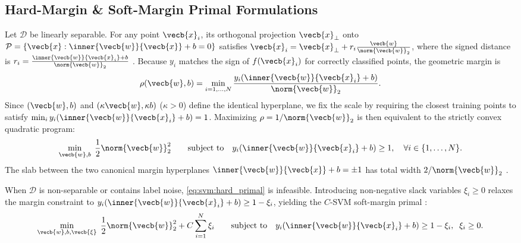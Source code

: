 \documentclass[../../../../master.tex]{subfiles}
\begin{document}
\subsection{Hard-Margin \& Soft-Margin Primal Formulations}

\begin{coremath}
Let $\mathcal{D}$ be linearly separable. For any point $\vecb{x}_i$, its orthogonal projection $\vecb{x}_{\perp}$ onto $\mathcal{P} = \{\vecb{x} : \inner{\vecb{w}}{\vecb{x}} + b = 0\}$ satisfies $\vecb{x}_i = \vecb{x}_{\perp} + r_i \frac{\vecb{w}}{\norm{\vecb{w}}_2}$, where the signed distance is $r_i = \frac{\inner{\vecb{w}}{\vecb{x}_i} + b}{\norm{\vecb{w}}_2}$  . Because $y_i$ matches the sign of $f(\vecb{x}_i)$ for correctly classified points, the geometric margin is
\begin{equation}
  \rho(\vecb{w}, b) = \min_{i=1,\dots,N} \frac{y_i (\inner{\vecb{w}}{\vecb{x}_i} + b)}{\norm{\vecb{w}}_2}.
  \label{eq:svm:geom_margin}
\end{equation}
Since $(\vecb{w}, b)$ and $(\kappa\vecb{w}, \kappa b)$ ($\kappa > 0$) define the identical hyperplane, we fix the scale by requiring the closest training points to satisfy $\min_i y_i(\inner{\vecb{w}}{\vecb{x}_i} + b) = 1$. Maximizing $\rho = 1/\norm{\vecb{w}}_2$ is then equivalent to the strictly convex quadratic program:
\begin{equation}
  \min_{\vecb{w}, b} \; \frac{1}{2}\norm{\vecb{w}}_2^2 \qquad \text{subject to} \quad y_i(\inner{\vecb{w}}{\vecb{x}_i} + b) \ge 1, \quad \forall i \in \{1,\dots,N\}.
  \label{eq:svm:hard_primal}
\end{equation}
The slab between the two canonical margin hyperplanes $\inner{\vecb{w}}{\vecb{x}} + b = \pm 1$ has total width $2 / \norm{\vecb{w}}_2$ .
\end{coremath}

When $\mathcal{D}$ is non-separable or contains label noise, \eqref{eq:svm:hard_primal} is infeasible. Introducing non-negative slack variables $\xi_i \ge 0$ relaxes the margin constraint to $y_i(\inner{\vecb{w}}{\vecb{x}_i} + b) \ge 1 - \xi_i$, yielding the $C$-SVM soft-margin primal  :
\begin{equation}
  \min_{\vecb{w}, b, \vecb{\xi}} \; \frac{1}{2}\norm{\vecb{w}}_2^2 + C \sum_{i=1}^N \xi_i
  \qquad \text{subject to} \quad y_i(\inner{\vecb{w}}{\vecb{x}_i} + b) \ge 1 - \xi_i, \;\; \xi_i \ge 0.
  \label{eq:svm:soft_primal}
\end{equation}
\end{document}
